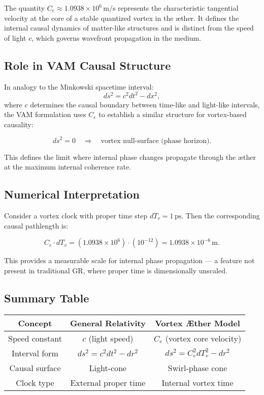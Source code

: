 \documentclass[12pt]{article}
\begin{document}
    The quantity \( C_e \approx 1.0938 \times 10^6 \, \text{m/s} \) represents the characteristic tangential velocity at the core of a stable quantized vortex in the æther. It defines the internal causal dynamics of matter-like structures and is distinct from the speed of light \( c \), which governs wavefront propagation in the medium.

    \subsection*{Role in VAM Causal Structure}

    In analogy to the Minkowski spacetime interval:
    \[
        ds^2 = c^2 dt^2 - dx^2,
    \]
    where \( c \) determines the causal boundary between time-like and light-like intervals, the VAM formulation uses \( C_e \) to establish a similar structure for vortex-based causality:

    \[
        ds^2 = 0 \quad \Rightarrow \quad \text{vortex null-surface (phase horizon)}.
    \]

    This defines the limit where internal phase changes propagate through the æther at the maximum internal coherence rate.

    \subsection*{Numerical Interpretation}

    Consider a vortex clock with proper time step \( dT_v = 1 \, \text{ps} \). Then the corresponding causal pathlength is:

    \[
        C_e \cdot dT_v = (1.0938 \times 10^6)\cdot(10^{-12}) = 1.0938 \times 10^{-6} \, \text{m}.
    \]

    This provides a measurable scale for internal phase propagation — a feature not present in traditional GR, where proper time is dimensionally unscaled.

    \subsection*{Summary Table}

    \begin{center}
        \begin{tabular}{|c|c|c|}
            \hline
            \textbf{Concept} & \textbf{General Relativity} & \textbf{Vortex Æther Model} \\
            \hline
            Speed constant & \( c \) (light speed) & \( C_e \) (vortex core velocity) \\
            \hline
            Interval form & \( ds^2 = c^2 dt^2 - dr^2 \) & \( ds^2 = C_e^2 dT_v^2 - dr^2 \) \\
            \hline
            Causal surface & Light-cone & Swirl-phase cone \\
            \hline
            Clock type & External proper time & Internal vortex time \\
            \hline
        \end{tabular}
    \end{center}
\end{document}
